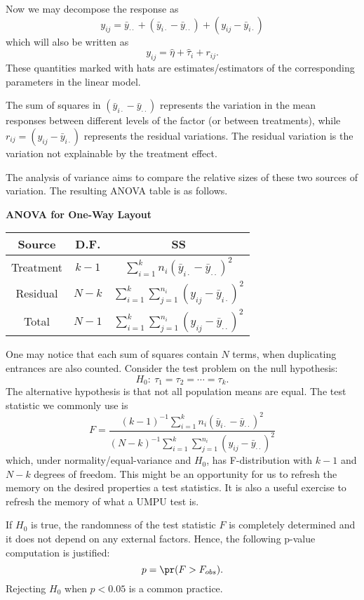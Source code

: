 Now we may decompose the response as
\[
y_{ij} 
= \bar y_{\cdot \cdot} + ( \bar y_{i \cdot} - \bar y_{\cdot \cdot})
+ ( y_{i j} - \bar y_{i \cdot})
\]
which will also be written as
\[
y_{ij} = \hat \eta + \hat \tau_i + r_{ij}.
\]
These quantities marked with hats are estimates/estimators of the corresponding
parameters in the linear model. 

The sum of squares in $( \bar y_{i \cdot} - \bar y_{\cdot \cdot})$ represents
the variation in the mean responses
between different levels of the factor (or between treatments),
while $r_{ij} = ( y_{i j} - \bar y_{i \cdot})$ represents the residual variations.
The residual variation is the variation not explainable by the treatment effect.

The analysis of variance aims to compare the relative sizes of these two
sources of variation. The resulting ANOVA table is as follows.

\vs \vs \noindent
\begin{center}
{\bf ANOVA for One-Way Layout} \vs\vs\\
\begin{tabular}{ccc} \hline
Source & D.F.& SS \\ \hline
Treatment & $k-1$ & $\sum_{i=1}^k n_i ( \bar y_{i \cdot} - \bar y_{\cdot \cdot})^2$\\
Residual & $N-k$ & $\sum_{i=1}^k \sum_{j=1}^{n_i} ( y_{i j} - \bar y_{i \cdot})^2$\\
Total & $N-1$ & $\sum_{i=1}^k \sum_{j=1}^{n_i} ( y_{i j} - \bar y_{\cdot \cdot})^2$ \\
\hline
\end{tabular}
\end{center}
\vs

One may notice that each sum of squares contain $N$ terms, when
duplicating entrances are also counted. 
Consider the test problem on the null hypothesis:
\[
H_0:~ \tau_1 = \tau_2 = \cdots = \tau_k.
\]
The alternative hypothesis is that not all population means are equal. 
The test statistic we commonly use is 
\[
F 
= 
\frac{ (k-1)^{-1} \sum_{i=1}^k n_i ( \bar y_{i \cdot} - \bar y_{\cdot \cdot})^2}
{(N-k)^{-1} \sum_{i=1}^k \sum_{j=1}^{n_i} ( y_{i j} - \bar y_{\cdot \cdot})^2}
\]
which, under normality/equal-variance and $H_0$, has F-distribution with
$k-1$ and $N-k$ degrees of freedom. This might be an opportunity for us
to refresh the memory on the desired properties a test statistics.
It is also a useful exercise to refresh the memory of what a UMPU test is.

If $H_0$ is true, the randomness of the test statistic $F$ is 
completely determined and it does not depend on any external factors. 
Hence, the following p-value computation is justified:
\[
p = \pr( F > F_{obs}).
\]
Rejecting $H_0$  when $p < 0.05$ is a common practice.

